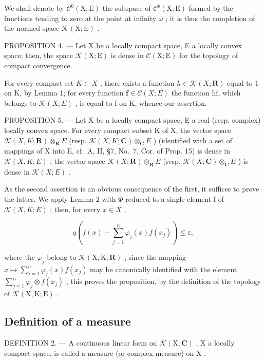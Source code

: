 We shall denote by \(\mathcal{C}^{0}(\mathrm{X};\mathrm{E})\) the subspace of \(\mathcal{C}^{b}(\mathrm{X};\mathrm{E})\) formed by the functions tending to zero at the point at infinity \(\omega\) ; it is thus the completion of the normed space \(\mathcal{K}(\mathrm{X};\mathrm{E})\) .

PROPOSITION 4. --- Let X be a locally compact space, E a locally convex space; then, the space \(\mathcal{K}(\mathrm{X};\mathrm{E})\) is dense in \(\mathcal{C}(\mathrm{X};\mathrm{E})\) for the topology of compact convergence.

For every compact set \(K \subset X\) , there exists a function \(h \in \mathcal{K}(X; \mathbf{R})\) equal to 1 on K, by Lemma 1; for every function \(\mathbf{f} \in \mathcal{C}(X; E)\) the function hf, which belongs to \(\mathcal{K}(X; E)\) , is equal to f on K, whence our assertion.

PROPOSITION 5. --- Let X be a locally compact space, E a real (resp. complex) locally convex space. For every compact subset K of X, the vector space \(\mathcal{K}(X,K;\mathbf{R})\otimes_{\mathbf{R}}E\) (resp. \(\mathcal{K}(X,K;\mathbf{C})\otimes_{\mathbf{C}}E\) ) (identified with a set of mappings of X into E, cf.~A, II, §7, No.~7, Cor. of Prop. 15) is dense in \(\mathcal{K}(X,K;E)\) ; the vector space \(\mathcal{K}(X;\mathbf{R})\otimes_{\mathbf{R}}E\) (resp. \(\mathcal{K}(X;\mathbf{C})\otimes_{\mathbf{C}}E\) ) is dense in \(\mathcal{K}(X;E)\) .

As the second assertion is an obvious consequence of the first, it suffices to prove the latter. We apply Lemma 2 with \(\Phi\) reduced to a single element f of \(\mathcal{K}(X,K;E)\) ; then, for every \(x\in X\) ,

\[
q \left(f (x) - \sum_ {j = 1} ^ {n} \varphi_ {j} (x) f \left(x _ {j}\right)\right) \leqslant \varepsilon ,
\]

where the \(\varphi_{j}\) belong to \(\mathcal{K}(\mathrm{X},\mathrm{K};\mathbf{R})\) ; since the mapping \(x\mapsto \sum_{j = 1}^{n}\varphi_{j}(x)f(x_{j})\) may be canonically identified with the element \(\sum_{j = 1}^{n}\varphi_{j}\otimes f(x_{j})\) , this proves the proposition, by the definition of the topology of \(\mathcal{K}(\mathrm{X},\mathrm{K};\mathrm{E})\) .

\subsection{Definition of a measure}

DEFINITION 2. --- A continuous linear form on \(\mathcal{K}(\mathrm{X};\mathbf{C})\) , \(\mathrm{X}\) a locally compact space, is called a measure (or complex measure) on \(\mathrm{X}\) .

